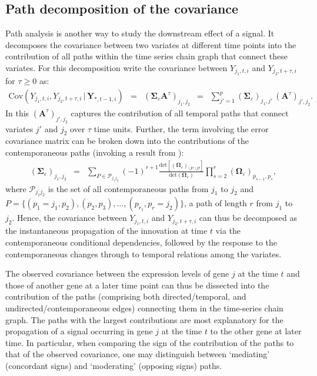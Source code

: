 \subsection{Path decomposition of the covariance} \label{sect.pathDecomposition}
Path analysis is another way to study the downstream effect of a signal. It decomposes the covariance between two variates at different time points into the contribution of all paths within the time series chain graph that connect these variates. For this decomposition write the covariance between $Y_{j_1,t, i}$ and $Y_{j_2,t+\tau,i}$ for $\tau \geq 0$ as:
\begin{eqnarray*}
\mbox{Cov}(Y_{j_1,t,i}, Y_{j_2,t+\tau,i} \, | \, \mathbf{Y}_{\ast,t-1,i} ) & = & ( \mathbf{\Sigma}_{\varepsilon} \mathbf{A}^{\tau})_{j_1, j_2} \, \, \, = \, \, \, \sum_{j'=1}^{p} (\mathbf{\Sigma}_{\varepsilon})_{j_1, j'} \,  (\mathbf{A}^{\tau})_{j', j_2}.
\end{eqnarray*}
In this $(\mathbf{A}^{\tau})_{j', j_2}$ captures the contribution of all temporal paths that connect variates $j'$ and $j_2$ over $\tau$ time units. Further, the term involving the error covariance matrix can be broken down into the contributions of the contemporaneous paths (invoking a result from \cite{Jones2005}):
\begin{eqnarray*}
(\mathbf{\Sigma}_{\varepsilon})_{j_1, j_2} & = & \sum_{P \in \mathcal{P}_{j_1 j_2}} (-1)^{r+1} \frac{\mbox{det}[(\mathbf{\Omega}_{\varepsilon})_{\setminus P, \setminus P}]}{\mbox{det}(\mathbf{\Omega}_{\varepsilon})} \prod_{s=2}^{r} (\mathbf{\Omega}_{\varepsilon})_{p_{s-1}, p_s},
\end{eqnarray*}
where $\mathcal{P}_{j_1 j_2}$ is the set of all contemporaneous paths from $j_1$ to $j_2$ and $P = \{ (p_1 = j_1, p_2), (p_2, p_3), \ldots, (p_{r_1}, p_r = j_2) \}$, a path of length $r$ from $j_1$ to $j_2$. Hence, the covariance between $Y_{j_1,t,i}$ and $Y_{j_2,t+\tau,i}$ can thus be decomposed as the instantaneous propagation of the innovation at time $t$ via the contemporaneous conditional dependencies, followed by the response to the contemporaneous changes through to temporal relations among the variates. 

The observed covariance between the expression levels of gene $j$ at the time $t$ and those of another gene at a later time point can thus be dissected into the contribution of the paths (comprising both directed/temporal, and undirected/contemporaneous edges) connecting them in the time-series chain graph. The paths with the largest contributions are most explanatory for the propagation of a signal occurring in gene $j$ at the time $t$ to the other gene at later time. In particular, when comparing the sign of the contribution of the paths to that of the observed covariance, one may distinguish between `mediating' (concordant signs) and `moderating' (opposing signs) paths.




